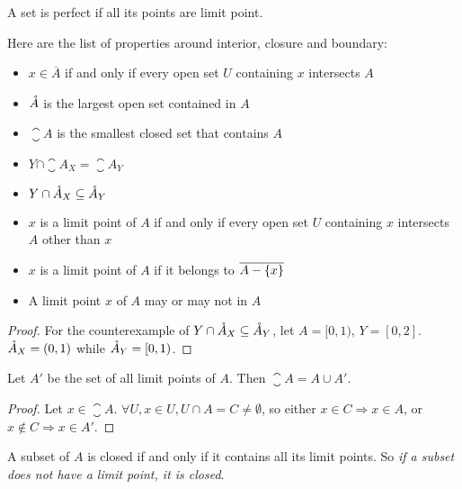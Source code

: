 \begin{definition}
    A set is perfect if all its points are limit point.
\end{definition}

\begin{theorem}
    Here are the list of properties around interior, closure and boundary:
    \begin{itemize}
        \item $x \in \overline{A}$ if and only if every open set $U$ containing $x$ intersects $A$
        \item $\mathring{A}$ is the largest open set contained in $A$
        \item $\closure{A}$ is the smallest closed set that contains $A$
        \item $Y \cap \closure{A}_X = \closure{A}_Y$
        \item $Y \cap \mathring{A}_X \subseteq \mathring{A}_Y$
        \item $x$ is a limit point of $A$ if and only if every open set $U$ containing $x$ intersects $A$ other than $x$
        \item $x$ is a limit point of $A$ if it belongs to $\overline{A - \set{x}}$
        \item A limit point $x$ of $A$ may or may not in $A$
    \end{itemize}
\end{theorem}
\begin{proof}
    For the counterexample of $Y \cap \mathring{A}_X \subseteq \mathring{A}_Y$, let $A = [0,1)$, $Y = [0,2]$. $\mathring{A}_X = (0,1)$ while $\mathring{A}_Y = [0,1)$.
\end{proof}





\begin{theorem}
    Let $A'$ be the set of all limit points of $A$. Then $\closure{A} = A \cup A'$.
\end{theorem}
\begin{proof}
    Let $x \in \closure{A}$. $\forall U, x \in U, U \cap A = C \neq \emptyset$, so either $x \in C \Rightarrow x \in A$, or $x \notin C \Rightarrow x \in A'$.
\end{proof}

\begin{theorem}
A subset of $A$ is closed if and only if it contains all its limit points. So \emph{if a subset does not have a limit point, it is closed}.
\end{theorem}


